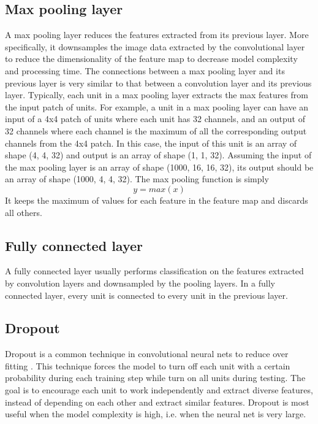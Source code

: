 \subsection{Max pooling layer}
A max pooling layer reduces the features extracted from its previous layer.
More specifically, it downsamples the image data extracted by the convolutional layer to reduce the dimensionality of the feature map to decrease model complexity and processing time.
The connections between a max pooling layer and its previous layer is very similar to that between a convolution layer and its previous layer.
Typically, each unit in a max pooling layer extracts the max features from the input patch of units.
For example, a unit in a max pooling layer can have an input of a 4x4 patch of units where each unit has 32 channels, and an output of 32 channels where each channel is the maximum of all the corresponding output channels from the 4x4 patch.
In this case, the input of this unit is an array of shape (4, 4, 32) and output is an array of shape (1, 1, 32).
Assuming the input of the max pooling layer is an array of shape (1000, 16, 16, 32), its output should be an array of shape (1000, 4, 4, 32).
The max pooling function is simply
\[ y = max(x) \]
It keeps the maximum of values for each feature in the feature map and discards all others.

\subsection{Fully connected layer}
A fully connected layer usually performs classification on the features extracted by convolution layers and downsampled by the pooling layers.
In a fully connected layer, every unit is connected to every unit in the previous layer.

\subsection{Dropout}
Dropout is a common technique in convolutional neural nets to reduce over fitting \cite{srivastava2014dropout}. This technique forces the model to turn off each unit with a certain probability during each training step while turn on all units during testing.
The goal is to encourage each unit to work independently and extract diverse features, instead of depending on each other and extract similar features.
Dropout is most useful when the model complexity is high, i.e. when the neural net is very large.

